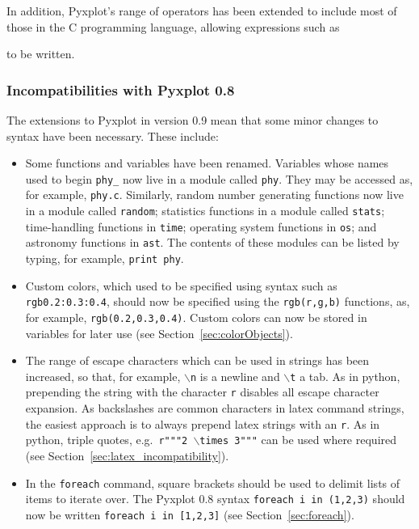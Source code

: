 In addition, Pyxplot's range of operators has been extended to include most of those in the C programming language, allowing expressions such as

\vspace{3mm}

\vspace{3mm}

\noindent to be written.

\subsubsection*{Incompatibilities with Pyxplot 0.8}

The extensions to Pyxplot in version 0.9 mean that some minor changes to syntax have been necessary. These include:

\begin{itemize}
\item Some functions and variables have been renamed. Variables whose names used to begin {\tt phy\_} now live in a module called {\tt phy}. They may be accessed as, for example, {\tt phy.c}. Similarly, random number generating functions now live in a module called {\tt random}; statistics functions in a module called {\tt stats}; time-handling functions in {\tt time}; operating system functions in {\tt os}; and astronomy functions in {\tt ast}. The contents of these modules can be listed by typing, for example, {\tt print phy}.
\item Custom colors, which used to be specified using syntax such as {\tt rgb0.2:0.3:0.4}, should now be specified using the {\tt rgb(r,g,b)} functions, as, for example, {\tt rgb(0.2,0.3,0.4)}. Custom colors can now be stored in variables for later use (see Section~\ref{sec:colorObjects}).
\item The range of escape characters which can be used in strings has been increased, so that, for example, {\tt $\backslash$n} is a newline and {\tt $\backslash$t} a tab. As in python, prepending the string with the character {\tt r} disables all escape character expansion. As backslashes are common characters in latex command strings, the easiest approach is to always prepend latex strings with an {\tt r}. As in python, triple quotes, e.g.\ {\tt r"""2 $\backslash$times 3"""} can be used where required (see Section~\ref{sec:latex_incompatibility}).
\item In the {\tt foreach} command, square brackets should be used to delimit lists of items to iterate over. The Pyxplot 0.8 syntax {\tt foreach i in (1,2,3)} should now be written {\tt foreach i in [1,2,3]} (see Section~\ref{sec:foreach}).
\end{itemize}

